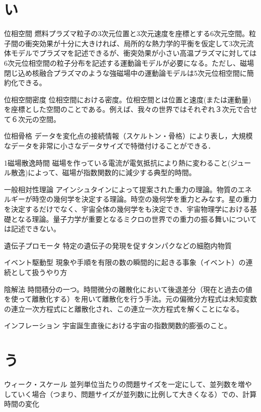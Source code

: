 \begin{用語集}
\section{い}
\item{位相空間}{}
{燃料プラズマ粒子の3次元位置と3次元速度を座標とする6次元空間。粒子間の衝突効果が十分に大きければ、局所的な熱力学的平衡を仮定して3次元流体モデルでプラズマを記述できるが、衝突効果が小さい高温プラズマに対しては6次元位相空間の粒子分布を記述する運動論モデルが必要になる。ただし、磁場閉じ込め核融合プラズマのような強磁場中の運動論モデルは5次元位相空間に簡約化できる。}
\item{位相空間密度}{}
{位相空間における密度。位相空間とは位置と速度(または運動量)を座標とした空間のことである。例えば、我々の世界ではそれぞれ３次元で合せて６次元の空間。}
\item{位相骨格}{}
{データを変化点の接続情報（スケルトン・骨格）により表し，大規模なデータを非常に小さなデータサイズで特徴付けることができる．}
\item{1磁場散逸時間}{}
{磁場を作っている電流が電気抵抗により熱に変わること(ジュール散逸)によって、磁場が指数関数的に減少する典型的時間。}
\item{一般相対性理論}{}
{アインシュタインによって提案された重力の理論。物質のエネルギーが時空の幾何学を決定する理論。時空の幾何学を重力とみなす。星の重力を決定するだけでなく、宇宙全体の幾何学をも決定でき、宇宙物理学における基礎となる理論。量子力学が重要となるミクロの世界での重力の振る舞いについては記述できない。}
\item{遺伝子プロモータ}{}
{特定の遺伝子の発現を促すタンパクなどの細胞内物質}
\item{イベント駆動型}{}
{現象や手順を有限の数の瞬間的に起きる事象（イベント）の連続として扱うやり方}
\item{陰解法}{}
{時間積分の一つ。時間微分の離散化において後退差分（現在と過去の値を使って離散化する）を用いて離散化を行う手法。元の偏微分方程式は未知変数の連立一次方程式にと離散化され、この連立一次方程式を解くことになる。}
\item{インフレーション}{}
{宇宙誕生直後における宇宙の指数関数的膨張のこと。}
\section{う}
\item{ウィーク・スケール}{}
{並列単位当たりの問題サイズを一定にして、並列数を増やしていく場合（つまり、問題サイズが並列数に比例して大きくなる）での、計算時間の変化}

\end{用語集}

